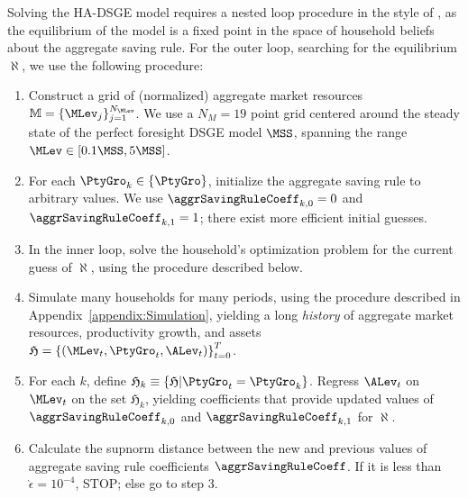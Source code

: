 Solving the HA-DSGE model requires a nested loop procedure in the style of \cite{ksHetero},
as the equilibrium of the model is a fixed point in the space of household beliefs about the
aggregate saving rule. For the outer loop, searching for the equilibrium $\aleph$, we use the following procedure:
\begin{enumerate}
\item Construct a grid of (normalized) aggregate market resources $\mathbb{M} = \{\MLev_j \}_{j=1}^{N_\MLev}$.
We use a $N_M = 19$ point grid centered around the steady state of the perfect foresight DSGE model $\MSS$, spanning
the range $\MLev \in [0.1 \MSS, 5 \MSS]$.

\item For each $\PtyGro_k \in \{\PtyGro\}$, initialize the aggregate saving rule to arbitrary values.
We use $\aggrSavingRuleCoeff_{k,0} = 0$ and $\aggrSavingRuleCoeff_{k,1} = 1$; there exist more efficient initial guesses.

\item In the inner loop, solve the household's optimization problem for the current guess of $\aleph$,
using the procedure described below.

\item Simulate many households for many periods, using the procedure described in
Appendix~\ref{appendix:Simulation}, yielding a long \textit{history} of aggregate
market resources, productivity growth, and assets $\mathfrak{H} = \left\{(\MLev_t,\PtyGro_t,\ALev_t)\right\}_{t=0}^T$.

\item For each $k$, define $\mathfrak{H}_k \equiv \left\{ \mathfrak{H} | \PtyGro_t = \PtyGro_k \right\}$.
Regress $\ALev_t$ on $\MLev_t$ on the set $\mathfrak{H}_k$, yielding coefficients
that provide updated values of $\aggrSavingRuleCoeff_{k,0}$ and $\aggrSavingRuleCoeff_{k,1}$ for $\aleph$.

\item Calculate the supnorm distance between the new and previous values of aggregate
saving rule coefficients $\aggrSavingRuleCoeff$.  If it is less than $\grave{\epsilon} = 10^{-4}$, STOP;
else go to step 3.
\end{enumerate}

